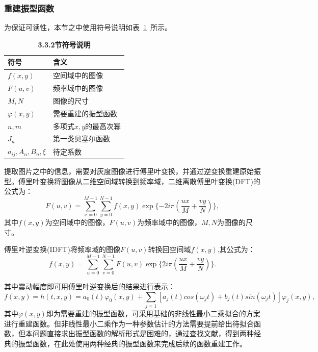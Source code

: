 \documentclass[withoutpreface,bwprint]{cumcmthesis} %
\begin{document}
\subsubsection{重建振型函数}
为保证可读性，本节之中使用符号说明如表~\ref{table-6}~所示。
\begin{table}[H]
	\caption{\textbf{3.3.2节符号说明}}%
	\centering
	\begin{tabular}{ll}%
		\hline %
		符号   &  含义  \\
		\hline %
		$f(x,y)$&空间域中的图像\\
		$F(u,v)$&频率域中的图像\\
		$M,N$&图像的尺寸\\
		$\varphi\left(x,y\right)$&需要重建的振型函数\\
		$n,m$&多项式$x,y$的最高次幂\\
		$J_n$&第一类贝塞尔函数\\
		$a_{ij},A_n,B_n,\xi$&待定系数\\
		\hline %
	\end{tabular} \label{table-6}
\end{table}
提取图片之中的信息，需要对灰度图像进行傅里叶变换，并通过逆变换重建原始振型。傅里叶变换将图像从二维空间域转换到频率域，二维离散傅里叶变换(DFT)的公式为：
\begin{equation}
	F(u,v)=\sum_{x=0}^{M-1}\sum_{y=0}^{N-1}f(x,y)\exp\{-2i\pi(\frac{ux}{M}+\frac{vy}{N})\},\label{31}
\end{equation}
其中$f(x,y)$为空间域中的图像，$F(u,v)$为频率域中的图像，$M,N$为图像的尺寸。

傅里叶逆变换(IDFT)将频率域的图像$F(u,v)$转换回空间域$f(x,y)$,其公式为：
\begin{equation}
	f(x,y)=\sum_{u=0}^{M-1}\sum_{v=0}^{N-1}F(u,v)\exp\{2i\pi(\frac{ux}{M}+\frac{vy}{N})\}.\label{32}
\end{equation}

其中震动幅度即可用傅里叶逆变换后的结果进行表示：
\begin{equation}
    f(x,y)=h\left(t,x,y\right)={a_0\left(t\right)\varphi}_0\left(x,y\right)+\sum_{j=1}[a_j\left(t\right)cos\left(\omega_jt\right)+b_j\left(t\right)sin\left(\omega_jt\right)]\varphi_j\left(x,y\right), \label{33}
\end{equation}
其中$\varphi\left(x,y\right)$即为需要重建的振型函数，可采用基础的非线性最小二乘拟合的方案进行重建函数。但非线性最小二乘作为一种参数估计的方法需要提前给出待拟合函数，但本问题直接求出振型函数的解析形式是困难的，通过查找文献\cite{ref5}，得到两种经典的振型函数，在此处使用两种经典的振型函数来完成后续的函数重建工作。
\end{document}
